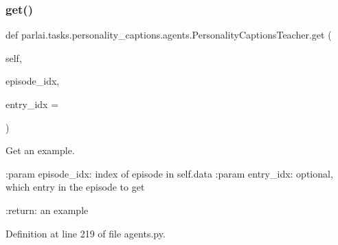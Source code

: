 \mbox{\label{classparlai_1_1tasks_1_1personality__captions_1_1agents_1_1PersonalityCaptionsTeacher_a2f146ae93a6b1f19e570ef7aa8950c1b}} 
\subsubsection{\texorpdfstring{get()}{get()}}
{\footnotesize\ttfamily def parlai.\+tasks.\+personality\+\_\+captions.\+agents.\+Personality\+Captions\+Teacher.\+get (\begin{DoxyParamCaption}\item[{}]{self,  }\item[{}]{episode\+\_\+idx,  }\item[{}]{entry\+\_\+idx = {} }\end{DoxyParamCaption})}

\begin{DoxyVerb}Get an example.

:param episode_idx:
    index of episode in self.data
:param entry_idx:
    optional, which entry in the episode to get

:return:
    an example
\end{DoxyVerb}
 

Definition at line 219 of file agents.\+py.



